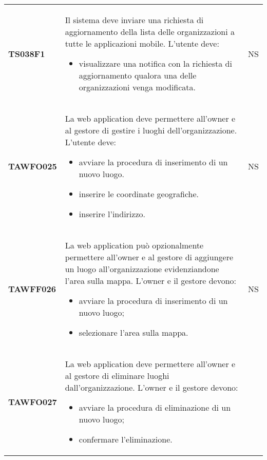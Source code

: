 \documentclass[../piano-di-qualifica.tex]{subfiles}
\begin{document}
\begin{centering}
\begin{longtable}[H]{>{\centering\bfseries}m{3cm} >{}p{10cm} >{\centering\arraybackslash}m{3cm}}
        TS038F1     & Il sistema deve inviare una richiesta di aggiornamento della lista delle organizzazioni a tutte le applicazioni mobile. \newline
                      L'utente deve:
                      \begin{itemize}
                        \item visualizzare una notifica con la richiesta di aggiornamento qualora una delle organizzazioni venga modificata.
                      \end{itemize}
                    & NS \\
        TAWFO025      & La web application deve permettere all'owner e al gestore di gestire i luoghi dell'organizzazione. \newline
                        L'utente deve:
                        \begin{itemize}
                          \item avviare la procedura di inserimento di un nuovo luogo.
                          \item inserire le coordinate geografiche.
                          \item inserire l'indirizzo.
                        \end{itemize}
                      & NS \\
        TAWFF026      & La web application può opzionalmente permettere all'owner e al gestore di aggiungere un luogo all'organizzazione evidenziandone l'area sulla mappa. \newline
                        L'owner e il gestore devono:
                        \begin{itemize}
                          \item avviare la procedura di inserimento di un nuovo luogo;
                          \item selezionare l'area sulla mappa.
                        \end{itemize}
                      & NS \\
        TAWFO027      & La web application deve permettere all'owner e al gestore di eliminare luoghi dall'organizzazione. \newline
                        L'owner e il gestore devono:
                        \begin{itemize}
                          \item avviare la procedura di eliminazione di un nuovo luogo;
                          \item confermare l'eliminazione.

\end{itemize}
\end{longtable}
\end{centering}
\end{document}
